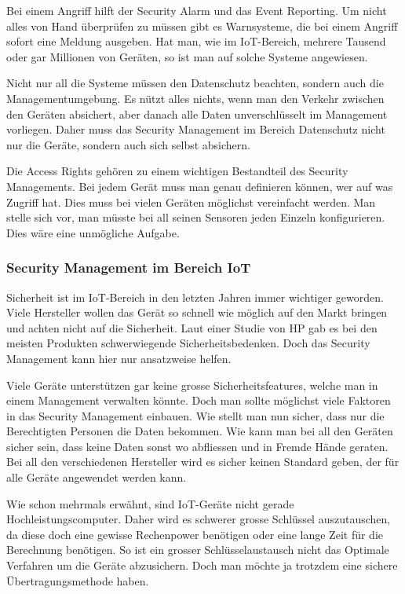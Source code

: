 Bei einem Angriff hilft der Security Alarm und das Event Reporting. Um nicht alles von Hand überprüfen zu müssen gibt es Warnsysteme, die bei einem Angriff sofort eine Meldung ausgeben. Hat man, wie im IoT-Bereich, mehrere Tausend oder gar Millionen von Geräten, so ist man auf solche Systeme angewiesen.

Nicht nur all die Systeme müssen den Datenschutz beachten, sondern auch die Managementumgebung. Es nützt alles nichts, wenn man den Verkehr zwischen den Geräten absichert, aber danach alle Daten unverschlüsselt im Management vorliegen. Daher muss das Security Management im Bereich Datenschutz nicht nur die Geräte, sondern auch sich selbst absichern.

Die Access Rights gehören zu einem wichtigen Bestandteil des Security Managements. Bei jedem Gerät muss man genau definieren können, wer auf was Zugriff hat. Dies muss bei vielen Geräten möglichst vereinfacht werden. Man stelle sich vor, man müsste bei all seinen Sensoren jeden Einzeln konfigurieren. Dies wäre eine unmögliche Aufgabe.
\subsubsection{Security Management im Bereich IoT}
Sicherheit ist im IoT-Bereich in den letzten Jahren immer wichtiger geworden. Viele Hersteller wollen das Gerät so schnell wie möglich auf den Markt bringen und achten nicht auf die Sicherheit. Laut einer Studie von HP gab es bei den meisten Produkten schwerwiegende Sicherheitsbedenken.\cite{SecOverview} Doch das Security Management kann hier nur ansatzweise helfen.

Viele Geräte unterstützen gar keine grosse Sicherheitsfeatures, welche man in einem Management verwalten könnte. Doch man sollte möglichst viele Faktoren in das Security Management einbauen. Wie stellt man nun sicher, dass nur die Berechtigten Personen die Daten bekommen. Wie kann man bei all den Geräten sicher sein, dass keine Daten sonst wo abfliessen und in Fremde Hände geraten. Bei all den verschiedenen Hersteller wird es sicher keinen Standard geben, der für alle Geräte angewendet werden kann.

Wie schon mehrmals erwähnt, sind IoT-Geräte nicht gerade Hochleistungscomputer. Daher wird es schwerer grosse Schlüssel auszutauschen, da diese doch eine gewisse Rechenpower benötigen oder eine lange Zeit für die Berechnung benötigen. So ist ein grosser Schlüsselaustausch nicht das Optimale Verfahren um die Geräte abzusichern. Doch man möchte ja trotzdem eine sichere Übertragungsmethode haben.

